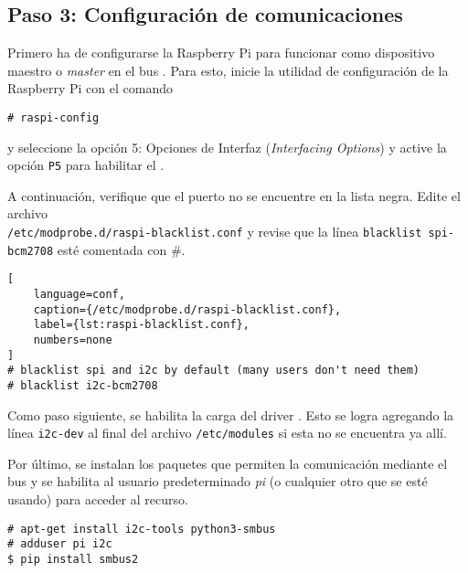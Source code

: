 %
%



\subsection{Paso 3: Configuración de comunicaciones \IIC}%
\label{sec:step3}
Primero ha de configurarse la Raspberry Pi para funcionar como dispositivo maestro o \emph{master} en el bus \IIC.
Para esto, inicie la utilidad de configuración de la Raspberry Pi con el comando

\begin{Verbatim}
# raspi-config
\end{Verbatim}

\noindent y seleccione la opción 5: Opciones de Interfaz (\emph{Interfacing Options}) y active la opción \texttt{P5} para habilitar el \IIC.

A continuación, verifique que el puerto \IIC no se encuentre en la lista negra.
Edite el archivo \\\texttt{/etc/modprobe.d/raspi-blacklist.conf} y revise que la línea \texttt{blacklist spi-bcm2708} esté comentada con \#.

\begin{lstlisting}[
	language=conf,
	caption={/etc/modprobe.d/raspi-blacklist.conf},
	label={lst:raspi-blacklist.conf},
	numbers=none
]
# blacklist spi and i2c by default (many users don't need them)
# blacklist i2c-bcm2708
\end{lstlisting}

Como paso siguiente, se habilita la carga del driver \IIC.
Esto se logra agregando la línea \texttt{i2c-dev} al final del archivo \texttt{/etc/modules} si esta no se encuentra ya allí.

Por último, se instalan los paquetes que permiten la comunicación mediante el bus \IIC y se habilita al usuario predeterminado \emph{pi} (o cualquier otro que se esté usando) para acceder al recurso.

\begin{Verbatim}
# apt-get install i2c-tools python3-smbus
# adduser pi i2c
$ pip install smbus2
\end{Verbatim}

